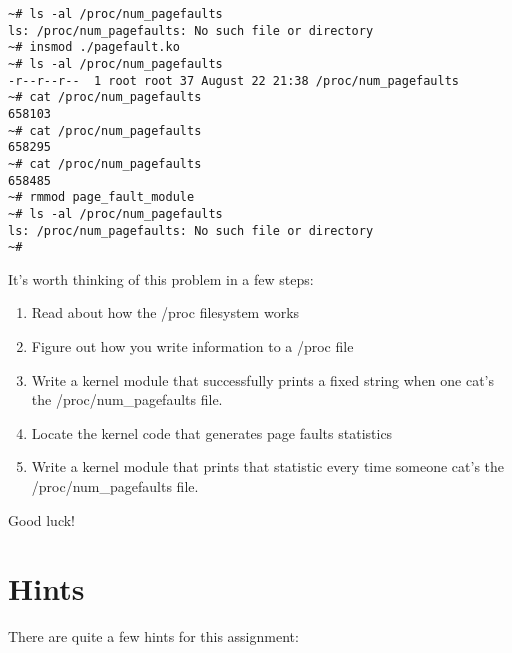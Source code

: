 \documentclass[11pt]{article}
\begin{document}
\begin{verbatim}
~# ls -al /proc/num_pagefaults
ls: /proc/num_pagefaults: No such file or directory
~# insmod ./pagefault.ko 
~# ls -al /proc/num_pagefaults
-r--r--r--  1 root root 37 August 22 21:38 /proc/num_pagefaults
~# cat /proc/num_pagefaults 
658103
~# cat /proc/num_pagefaults 
658295
~# cat /proc/num_pagefaults 
658485
~# rmmod page_fault_module
~# ls -al /proc/num_pagefaults
ls: /proc/num_pagefaults: No such file or directory
~#
\end{verbatim}

It's worth thinking of this problem in a few steps:

\begin{enumerate}
\item Read about how the /proc filesystem works
\item Figure out how you write information to a /proc file
\item Write a kernel module that successfully prints a fixed string when one cat's the /proc/num\_pagefaults file. 
\item Locate the kernel code that generates page faults statistics
\item Write a kernel module that prints that statistic every time someone cat's the /proc/num\_pagefaults file.
\end{enumerate}

Good luck!

\section*{Hints}

There are quite a few hints for this assignment:
\end{document}
